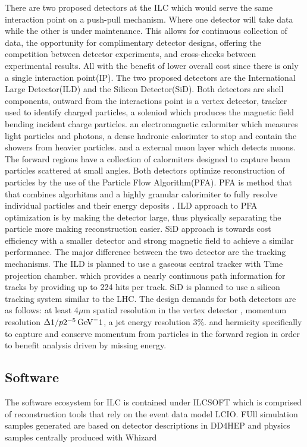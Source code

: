 There are two proposed detectors at the ILC which would serve the same interaction point on a push-pull mechanism. Where one detector will take data while the other is under maintenance. This allows for continuous collection of data, the opportunity for complimentary detector designs,  offering the competition between detector experiments, and cross-checks between experimental results. All with the benefit of lower overall cost since there is only a single interaction point(IP). The two proposed detectors are the International Large Detector(ILD) and the Silicon Detector(SiD). Both detectors are shell components, outward from the interactions point is a vertex detector, tracker used to identify charged particles, a soleniod which produces the magnetic field bending incident charge particles. an electromagnetic calormiter which measures light particles and photons, a dense hadronic calorimter to stop and contain the showers from  heavier particles. and a external muon layer which detects muons. The forward regions have a collection of calormiters designed to capture beam particles scattered at small angles. Both detectors optimize reconstruction of particles by the use of the Particle Flow Algorithm(PFA). PFA is method that that combines algorhitms and a highly granular calorimiter to fully resolve individual particles and their energy deposits \cite{pfa}.
ILD approach to PFA optimization is by making the detector large, thus physically separating the particle more making reconstruction easier. SiD approach is towards cost efficiency with a smaller detector and strong magnetic field to achieve a similar performance. 
 The major difference between the two detector are the tracking mechanisms.  The ILD is planned to use a gaseous central tracker  with Time projection chamber. which provides a nearly continuous path information for tracks by providing up to 224 hits per track. SiD is planned to use a silicon tracking system similar to the LHC. The design demands for both detectors are as follows: at least 4$\mu$m spatial resolution in the vertex detector , momentum resolution $\Delta 1/p 2\time 10^{-5} \, \text{GeV}^-1$, a jet energy resolution $3\%$. and hermicity specifically to capture and conserve momentum from particles in the forward region in order to benefit analysis driven by missing energy.

\subsection{Software}
\label{ilcsoft}

The software ecosystem for ILC is contained under ILCSOFT \cite{ilcsoft} which is comprised of reconstruction tools that rely on the event data model LCIO. FUll simulation samples generated are based on detector descriptions in DD4HEP \cite{dd4hep} and physics samples centrally produced with Whizard \cite{ whizard}


